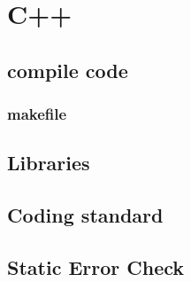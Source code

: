 \chapter{C++}

\section{compile code} 

\subsection{makefile} 

\section{Libraries} 

\section{Coding standard} 

\section{Static Error Check} 
